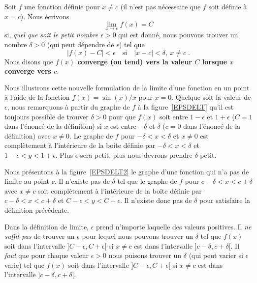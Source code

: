 {\begin{defn} 
Soit $f$ une fonction définie pour $x \neq c$ (il n'est pas
nécessaire que $f$ soit définie à $x=c$).  Nous écrivons
\[
\lim_{x\rightarrow c} f(x) = C
\]
si, {\em quel que soit le petit nombre $\epsilon >0$} qui est donné,
nous pouvons trouver un nombre $\delta >0$ (qui peut dépendre de
$\epsilon$) tel que
\[
| f(x) - C | < \epsilon \quad \text{si} \quad |x-c|<\delta,\ x\neq c \; .
\]
Nous disons que {\bfseries $f(x)$ converge (ou tend) vers la valeur $C$
lorsque $x$ converge vers $c$}.
\label{def2_conv}
\end{defn}


Nous illustrons cette nouvelle formulation de la limite d'une fonction
en un point à l'aide de la fonction $f(x) = \sin(x)/x$ pour $x=0$.
Quelque soit la valeur de $\epsilon$, nous remarquons à partir du graphe
de $f$ à la figure~\ref{EPSDELT} qu'il est toujours possible de trouver
$\delta>0$ pour que $f(x)$ soit entre $1-\epsilon$ et $1+\epsilon$
($C=1$ dans l'énoncé de la définition) si $x$ est entre $-\delta$ et
$\delta$ ($c=0$ dans l'énoncé de la définition) avec $x \neq 0$.  Le
graphe de $f$ pour $-\delta < x < \delta$ et $x\neq 0$ est
complètement à l'intérieure de la boite définie par
$-\delta < x < \delta$ et $1-\epsilon < y < 1+\epsilon$. 
Plus $\epsilon$ sera petit, plus nous devrons prendre $\delta$ petit.

Nous présentons à la figure~\ref{EPSDELT2} le graphe d'une fonction
qui n'a pas de limite au point $c$.  Il n'existe pas de $\delta$ tel
que le graphe de $f$ pour $c-\delta < x < c+\delta$ avec $x \neq c$
soit complètement à l'intérieure de la boite définie par 
$c-\delta < x < c+\delta$ et $C-\epsilon < y < C+\epsilon$.  Il
n'existe donc pas de $\delta$ pour satisfaire la définition
précédente.

Dans la définition de limite, $\epsilon$ prend n'importe laquelle des
valeurs positives.  Il {\em ne suffit pas} de trouver un $\epsilon$
pour lequel nous pouvons trouver un $\delta$ tel que $f(x)$ soit dans
l'intervalle $]C-\epsilon, C+\epsilon[$ si $x \neq c$ est dans
l'intervalle $]c-\delta , c+\delta[$.  Il {\em faut} que pour chaque
valeur $\epsilon>0$ nous puisons trouver un $\delta$ (qui peut varier si
$\epsilon$ varie) tel que $f(x)$ soit dans l'intervalle
$]C-\epsilon, C+\epsilon[$ si $x \neq c$ est dans l'intervalle
$]c-\delta , c+\delta[$.

}

